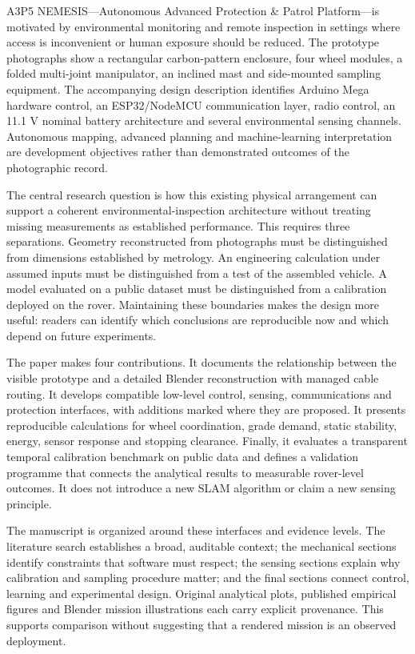 \documentclass[11pt,a4paper]{article}
\begin{document}
A3P5 NEMESIS---Autonomous Advanced Protection \& Patrol Platform---is motivated by environmental monitoring and remote inspection in settings where access is inconvenient or human exposure should be reduced. The prototype photographs show a rectangular carbon-pattern enclosure, four wheel modules, a folded multi-joint manipulator, an inclined mast and side-mounted sampling equipment. The accompanying design description identifies Arduino Mega hardware control, an ESP32/NodeMCU communication layer, radio control, an 11.1 V nominal battery architecture and several environmental sensing channels. Autonomous mapping, advanced planning and machine-learning interpretation are development objectives rather than demonstrated outcomes of the photographic record.

The central research question is how this existing physical arrangement can support a coherent environmental-inspection architecture without treating missing measurements as established performance. This requires three separations. Geometry reconstructed from photographs must be distinguished from dimensions established by metrology. An engineering calculation under assumed inputs must be distinguished from a test of the assembled vehicle. A model evaluated on a public dataset must be distinguished from a calibration deployed on the rover. Maintaining these boundaries makes the design more useful: readers can identify which conclusions are reproducible now and which depend on future experiments.

The paper makes four contributions. It documents the relationship between the visible prototype and a detailed Blender reconstruction with managed cable routing. It develops compatible low-level control, sensing, communications and protection interfaces, with additions marked where they are proposed. It presents reproducible calculations for wheel coordination, grade demand, static stability, energy, sensor response and stopping clearance. Finally, it evaluates a transparent temporal calibration benchmark on public data and defines a validation programme that connects the analytical results to measurable rover-level outcomes. It does not introduce a new SLAM algorithm or claim a new sensing principle.

The manuscript is organized around these interfaces and evidence levels. The literature search establishes a broad, auditable context; the mechanical sections identify constraints that software must respect; the sensing sections explain why calibration and sampling procedure matter; and the final sections connect control, learning and experimental design. Original analytical plots, published empirical figures and Blender mission illustrations each carry explicit provenance. This supports comparison without suggesting that a rendered mission is an observed deployment.
\end{document}
